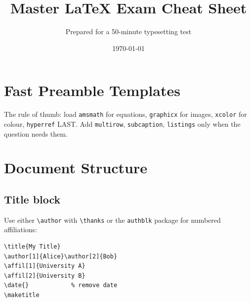 \documentclass[11pt]{article}
\title{\textbf{Master \LaTeX{} Exam Cheat Sheet}}
\author{Prepared for a 50-minute typesetting test}
\date{\today}
\theoremstyle{plain}
\theoremstyle{definition}
\theoremstyle{remark}
\begin{document}
\maketitle
\tableofcontents
\newpage

\section{Fast Preamble Templates}



The rule of thumb: load \texttt{amsmath} for equations,
\texttt{graphicx} for images, \texttt{xcolor} for colour,
\texttt{hyperref} LAST. Add \texttt{multirow}, \texttt{subcaption},
\texttt{listings} only when the question needs them.

\section{Document Structure}
\subsection{Title block}
Use either \texttt{\textbackslash author} with \texttt{\textbackslash thanks}
or the \texttt{authblk} package for numbered affiliations:
\begin{verbatim}
\title{My Title}
\author[1]{Alice}\author[2]{Bob}
\affil[1]{University A}
\affil[2]{University B}
\date{}            % remove date
\maketitle
\end{verbatim}
\end{document}

